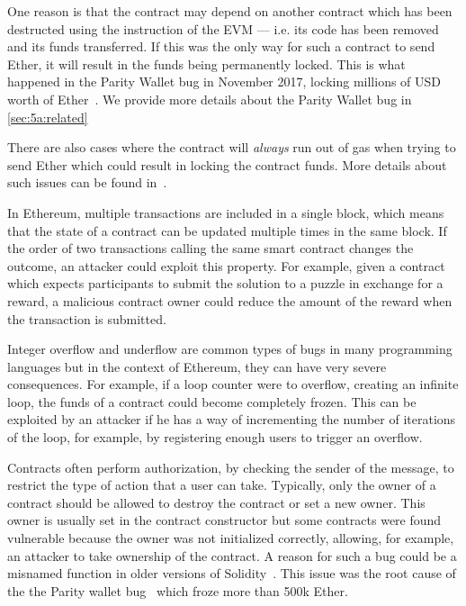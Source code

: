 One reason is that the contract may depend on another contract which has been
destructed using the  instruction of the EVM --- i.e. its code has been removed and its funds transferred. If this was the only way for such a contract to send Ether, it will result in the funds being permanently locked. This is what happened in the Parity Wallet bug in November 2017, locking millions of USD worth of Ether~\cite{Breidenbach}. We provide more details about the Parity Wallet bug in \autoref{sec:5a:related}

There are also cases where the contract will \emph{always} run out of gas when trying
to send Ether which could result in locking the contract funds. More details about such issues can be found in~\cite{Grech2018}.

\point{\transactionorder~(\vto)}
In Ethereum, multiple transactions are included in a single block, which means that the state of a contract can be updated multiple times in the same block. If the order of two transactions calling the same smart contract changes the outcome, an attacker could exploit this property. 
For example, given a contract which expects participants to submit the solution to a puzzle in exchange for a reward, a malicious contract owner could reduce the amount of the reward when the transaction is submitted.

\point{\integeroverflow~(\vio)}
Integer overflow and underflow are common types of bugs in many programming languages but in the context of Ethereum, they can have very severe consequences. For example, if a loop counter were to overflow, creating an infinite loop, the funds of a contract could become completely frozen. This can be exploited by an attacker if he has a way of incrementing the number of iterations of the loop, for example, by registering enough users to trigger an overflow.

\point{\unrestrictedaction~(\vua)}
Contracts often perform authorization, by checking the sender of the message, to restrict the type of action that a user can take.
Typically, only the owner of a contract should be allowed to destroy the contract or set a new owner.
This owner is usually set in the contract constructor but some contracts were found vulnerable because the owner was not initialized correctly, allowing, for example, an attacker to take ownership of the contract.
A reason for such a bug could be a misnamed function in older versions of Solidity~\cite{Brent2018,Krupp2018}.
This issue was the root cause of the the Parity wallet bug~\cite{Tsankov2018,Nikolic2018a} which froze more than 500k Ether.

